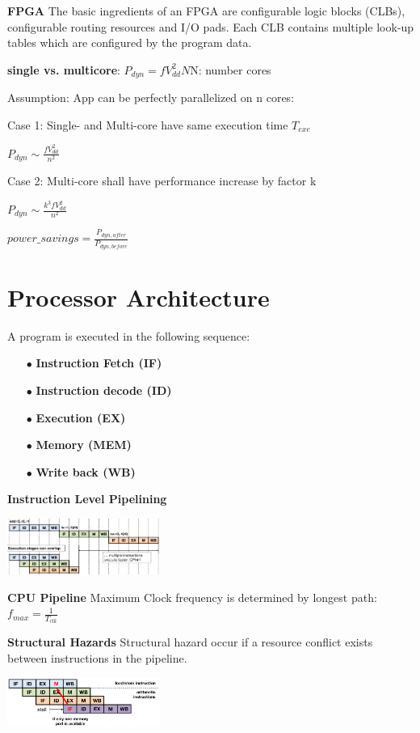 \documentclass[english]{latex4ei/latex4ei_sheet}
\begin{document}
\textbf{FPGA}
The basic ingredients of an FPGA are configurable logic blocks (CLBs), configurable routing resources and I/O pads. Each CLB contains multiple look-up tables which are configured by the program data.

\textbf{single vs. multicore}:
$P_{dyn} = f V_{dd}^2 N $\quad N: number cores

Assumption: App can be perfectly parallelized on n cores:

Case 1: Single- and Multi-core have same execution time $T_{exe}$

$P_{dyn} \sim \frac{f V_{dd}^2}{n^2}$

Case 2: Multi-core shall have performance increase by factor k

$P_{dyn} \sim \frac{k^3 f V_{dd}^2}{n^2}$

$power\_savings = \frac{P_{dyn, after}}{P_{dyn, before}}$

\section{Processor Architecture}

A program is executed in the following sequence:
\begin{enumerate}
	\item[$\bullet$] \textbf{Instruction Fetch (IF)}
	\item[$\bullet$] \textbf{Instruction decode (ID)}
	\item[$\bullet$] \textbf{Execution (EX)}
	\item[$\bullet$] \textbf{Memory (MEM)}
	\item[$\bullet$] \textbf{Write back (WB)}
\end{enumerate}

\textbf{Instruction Level Pipelining}
\begin{center}
	\includegraphics[width = 5cm]{images/4.ProcessorArchitecture/ILP.png}
\end{center}

\textbf{CPU Pipeline} Maximum Clock frequency is determined by longest path: $f_{max} = \frac{1}{T_{clk}}$

\textbf{Structural Hazards} Structural hazard occur if a resource conflict exists between instructions in the pipeline.
\begin{center}
	\includegraphics[width = 5cm]{images/4.ProcessorArchitecture/StrHazard.png}
\end{center}
\end{document}
